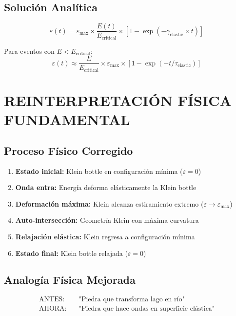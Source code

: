 \documentclass[12pt,a4paper]{article}
\begin{document}
\subsection{Solución Analítica}

\begin{equation}
\varepsilon(t) = \varepsilon_{\max} \times \frac{E(t)}{E_{\text{critical}}} \times [1 - \exp(-\gamma_{\text{elastic}} \times t)]
\end{equation}

Para eventos con $E < E_{\text{critical}}$:
\begin{equation}
\varepsilon(t) \approx \frac{E}{E_{\text{critical}}} \times \varepsilon_{\max} \times [1 - \exp(-t/\tau_{\text{elastic}})]
\end{equation}

\section{REINTERPRETACIÓN FÍSICA FUNDAMENTAL}

\subsection{Proceso Físico Corregido}

\begin{enumerate}
\item \textbf{Estado inicial:} Klein bottle en configuración mínima ($\varepsilon = 0$)
\item \textbf{Onda entra:} Energía deforma elásticamente la Klein bottle
\item \textbf{Deformación máxima:} Klein alcanza estiramiento extremo ($\varepsilon \to \varepsilon_{\max}$)
\item \textbf{Auto-intersección:} Geometría Klein con máxima curvatura
\item \textbf{Relajación elástica:} Klein regresa a configuración mínima
\item \textbf{Estado final:} Klein bottle relajada ($\varepsilon = 0$)
\end{enumerate}

\subsection{Analogía Física Mejorada}

\begin{align}
\text{ANTES:} &\quad \text{"Piedra que transforma lago en río"}\\
\text{AHORA:} &\quad \text{"Piedra que hace ondas en superficie elástica"}
\end{align}
\end{document}
